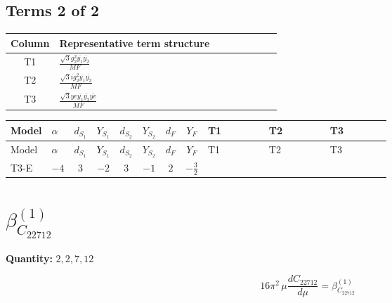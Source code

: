 \documentclass[8pt]{article}
\begin{document}
\begin{landscape}
\subsection*{Terms 2 of 2}
\begin{center}
\begin{tabular}{@{}c >{\raggedright\arraybackslash}p{0.82\linewidth}@{}}
\toprule
Column & Representative term structure \\
\midrule
T1 & \(\displaystyle \frac{\sqrt{3} g_{2}^{2} \overline{y_{1}} \overline{y_{2}}}{MF}\) \\
\midrule
T2 & \(\displaystyle \frac{\sqrt{3} i g_{2}^{2} \overline{y_{1}} \overline{y_{2}}}{MF}\) \\
\midrule
T3 & \(\displaystyle \frac{\sqrt{3} ye \overline{y_{1}} \overline{y_{2}} \overline{ye}}{MF}\) \\
\midrule
\bottomrule
\end{tabular}
\end{center}
\smallskip
\tiny
\begin{longtable}{@{}llcccccc >{\raggedright\arraybackslash}p{0.21\linewidth} >{\raggedright\arraybackslash}p{0.21\linewidth} >{\raggedright\arraybackslash}p{0.21\linewidth}@{}}
\toprule
Model & $\alpha$ & $d_{S_1}$ & $Y_{S_1}$ & $d_{S_2}$ & $Y_{S_2}$ & $d_F$ & $Y_F$ & T1 & T2 & T3 \\
\midrule
\endfirsthead
\toprule
Model & $\alpha$ & $d_{S_1}$ & $Y_{S_1}$ & $d_{S_2}$ & $Y_{S_2}$ & $d_F$ & $Y_F$ & T1 & T2 & T3 \\
\midrule
\endhead
T3-E & $-4$ & $3$ & $-2$ & $3$ & $-1$ & $2$ & $-\frac{3}{2}$ & \scriptsize\adjustbox{max width=\linewidth}{$\begin{gathered} \frac{11 \sqrt{3} g_{2}^{2} \overline{y_{1}} \overline{y_{2}}}{8 MF}\end{gathered}$} & \scriptsize\adjustbox{max width=\linewidth}{$\begin{gathered} - \frac{\sqrt{3} i g_{2}^{2} \overline{y_{1}} \overline{y_{2}}}{6 MF}\end{gathered}$} & \scriptsize\adjustbox{max width=\linewidth}{$\begin{gathered} - \frac{\sqrt{3} ye \overline{y_{1}} \overline{y_{2}} \overline{ye}}{12 MF}\end{gathered}$} \\
\midrule
\bottomrule
\end{longtable}
\clearpage
\section*{$\beta_{C_{22712}}^{(1)}$}
\noindent\textbf{Quantity: }$\mathrm{2,2,7,12}$\par\smallskip
\[16\pi^2\,\mu\frac{d C_{22712}}{d\mu}=\beta_{C_{22712}}^{(1)}\]

\end{landscape}
\end{document}
